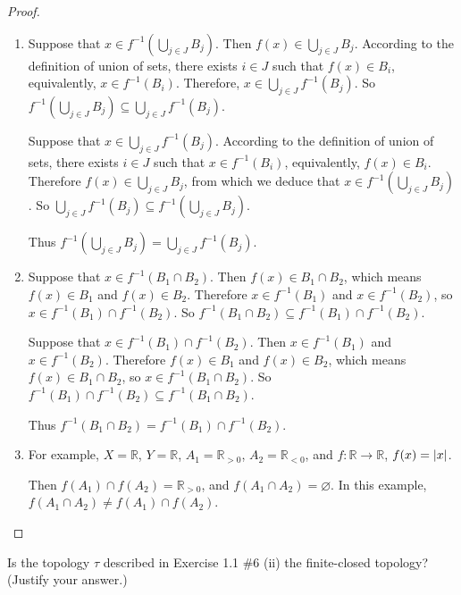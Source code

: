 \begin{proof}
    \begin{enumerate}[label={(\alph*)}]
        \item Suppose that $x\in f^{-1}\left( \bigcup_{j\in J} B_{j} \right)$. Then $f(x)\in \bigcup_{j\in J} B_{j}$. According to the definition of union of sets, there exists $i\in J$ such that $f(x)\in B_{i}$, equivalently, $x\in f^{-1}(B_{i})$. Therefore, $x\in \bigcup_{j\in J} f^{-1}(B_{j})$. So $f^{-1}\left(\bigcup_{j\in J} B_{j}\right) \subseteq \bigcup_{j\in J} f^{-1}(B_{j})$.

              Suppose that $x\in \bigcup_{j\in J} f^{-1}(B_{j})$. According to the definition of union of sets, there exists $i\in J$ such that $x\in f^{-1}(B_{i})$, equivalently, $f(x)\in B_{i}$. Therefore $f(x)\in \bigcup_{j\in J} B_{j}$, from which we deduce that $x\in f^{-1}\left( \bigcup_{j\in J} B_{j} \right)$. So $\bigcup_{j\in J} f^{-1}(B_{j}) \subseteq f^{-1}\left( \bigcup_{j\in J} B_{j} \right)$.

              Thus $f^{-1}\left( \bigcup_{j\in J} B_{j} \right) = \bigcup_{j\in J} f^{-1}(B_{j})$.
        \item Suppose that $x\in f^{-1}(B_{1}\cap B_{2})$. Then $f(x)\in B_{1}\cap B_{2}$, which means $f(x)\in B_{1}$ and $f(x)\in B_{2}$. Therefore $x\in f^{-1}(B_{1})$ and $x\in f^{-1}(B_{2})$, so $x\in f^{-1}(B_{1})\cap f^{-1}(B_{2})$. So $f^{-1}(B_{1}\cap B_{2})\subseteq f^{-1}(B_{1})\cap f^{-1}(B_{2})$.

              Suppose that $x\in f^{-1}(B_{1})\cap f^{-1}(B_{2})$. Then $x\in f^{-1}(B_{1})$ and $x\in f^{-1}(B_{2})$. Therefore $f(x)\in B_{1}$ and $f(x)\in B_{2}$, which means $f(x)\in B_{1}\cap B_{2}$, so $x\in f^{-1}(B_{1}\cap B_{2})$. So $f^{-1}(B_{1})\cap f^{-1}(B_{2})\subseteq f^{-1}(B_{1}\cap B_{2})$.

              Thus $f^{-1}(B_{1}\cap B_{2}) = f^{-1}(B_{1})\cap f^{-1}(B_{2})$.
        \item For example, $X = \mathbb{R}$, $Y = \mathbb{R}$, $A_{1} = \mathbb{R}_{> 0}$, $A_{2} = \mathbb{R}_{< 0}$, and $f: \mathbb{R}\to \mathbb{R}$, $f(x) = \left\vert{x}\right\vert$.

              Then $f(A_{1})\cap f(A_{2}) = \mathbb{R}_{> 0}$, and $f(A_{1}\cap A_{2}) = \varnothing$. In this example, $f(A_{1}\cap A_{2})\ne f(A_{1})\cap f(A_{2})$.
    \end{enumerate}
\end{proof}
\newpage

\begin{exercise}
    Is the topology $\tau$ described in Exercise 1.1 \#6 (ii) the finite-closed topology? (Justify your answer.)
\end{exercise}

